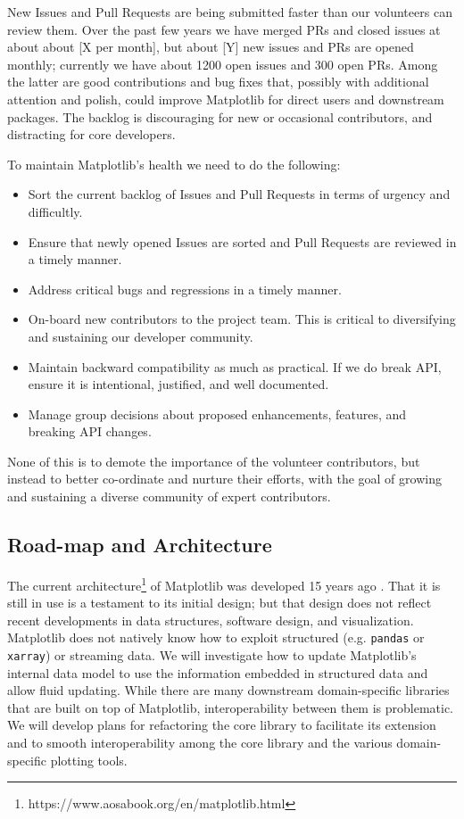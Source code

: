 \documentclass[11pt]{article}  %
\begin{document}
New Issues and Pull Requests are being submitted faster than our
volunteers can review them.
Over the past few years we have merged PRs and closed
issues at about about [X per month], but about [Y] new issues and PRs
are opened monthly; currently we have about 1200 open issues and
300 open PRs.
Among the latter are good contributions and bug fixes
that, possibly with additional attention and polish, could improve
Matplotlib for direct users and downstream packages.
The backlog is
discouraging for new or occasional contributors, and distracting for
core developers.

To maintain Matplotlib's health we need to do the following:

\begin{itemize}
\item Sort the current backlog of Issues and Pull Requests
  in terms of urgency and difficultly.
\item Ensure that newly opened Issues are sorted and Pull Requests
  are reviewed in a timely manner.
\item Address critical bugs and regressions in a timely manner.
\item On-board new contributors to the project team.  This is
  critical to diversifying and sustaining our developer community.
\item Maintain backward compatibility as much as practical.  If we do
  break API, ensure it is intentional, justified, and well documented.
\item Manage group decisions about proposed enhancements, features, and
  breaking API changes.
\end{itemize}

None of this is to demote the importance of the volunteer
contributors, but instead to better co-ordinate and nurture their
efforts, with the goal of growing and sustaining a diverse community
of expert contributors.

\subsection{Road-map and Architecture }

The current
architecture\footnote{https://www.aosabook.org/en/matplotlib.html} of
Matplotlib was developed 15 years ago \cite{Hunter:2007}.  That it is
still in use is a testament to its initial design; but that design
does not reflect recent developments in data structures, software
design, and visualization.  Matplotlib does not natively know how to
exploit structured (e.g. \texttt{pandas} or \texttt{xarray}) or
streaming data.  We will investigate how to update Matplotlib's
internal data model to use the information embedded in structured
data and allow fluid updating.
While there are many downstream domain-specific libraries that are built on
top of Matplotlib, interoperability between them is problematic.
We will develop
plans for refactoring the core library to facilitate its extension and
to smooth interoperability among the core library and the various
domain-specific plotting tools.
\end{document}
